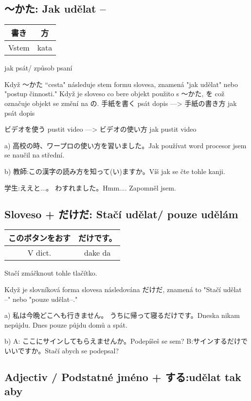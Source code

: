 \subsection{〜かた: Jak udělat --}
\begin{center}
\begin{tabular}{|c|c|}
\hline
書き&方\\
\hline
Vstem&kata\\
\hline
\end{tabular}
\end{center}
jak psát/ způsob psaní

Když 〜かた “cesta" následuje stem formu slovesa, znamená "jak udělat" nebo "postup činnosti." Když je sloveso co bere objekt použito s  〜かた, を což označuje objekt se změní na の.
手紙を書く psát dopis ––> 手紙の書き方 jak psát dopis

ビデオを使う pustit video ––> ビデオの使い方 jak pustit video


a) 高校の時、ワープロの使い方を習いました。Jak používat word procesor jsem se naučil na střední.

b) 教師:この漢字の読み方を知って(い)ますか。Víš jak se čte tohle kanji.

 学生:ええと...。 わすれました。Hmm.... Zapomněl jsem.

\subsection{ Sloveso + だけだ: Stačí udělat/ pouze udělám ~}
\begin{center}
\begin{tabular}{|c|c|}
\hline
このボタンをおす &だけです。\\
\hline
V dict. &dake da\\
\hline
\end{tabular}
\end{center}
Stačí zmáčknout tohle tlačítko.


Když je slovníková forma slovesa následována だけだ, znamená to "Stačí udělat --" nebo "pouze udělat--."

a) 私は今晩どこへも行きません。 うちに帰って寝るだけです。Dneska nikam nepůjdu. Dnes pouze půjdu domů a spát.

b) A: ここにサインしてもらえませんか。Podepíšeš se sem?
 B:サインするだけでいいですか。Stačí abych se podepsal?
 
 
\subsection{Adjectiv / Podstatné jméno + する:udělat tak aby}

